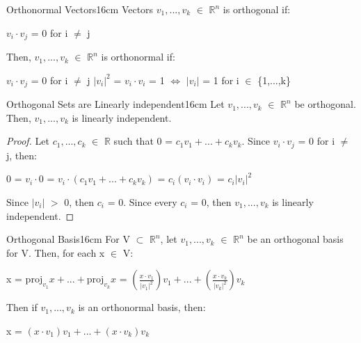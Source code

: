     \begin{definition}{Orthonormal Vectors}{16cm}
        Vectors $v_1,...,v_k$ $\in$ $\mathbb{R}^n$
        is {\color{lblue} orthogonal} if:
        
        \hspace{0.5cm}
        $v_i \cdot v_j$ = 0 for i $\not =$ j

        Then, $v_1,...,v_k$ $\in$ $\mathbb{R}^n$
        is {\color{lblue} orthonormal} if:
        
        \hspace{0.5cm}
        $v_i \cdot v_j$ = 0 for i $\not =$ j
        \hspace{1cm}
        $|v_i|^2$ = $v_i \cdot v_i$ = 1
        \hspace{0.5cm}
        $\Leftrightarrow$
        \hspace{0.5cm}
        $|v_i|$ = 1
        for i $\in$ \{1,...,k\}
    \end{definition}

    \newpage



    \begin{wtheorem}{Orthogonal Sets are Linearly independent}{16cm}
        Let $v_1,...,v_k$ $\in$ $\mathbb{R}^n$ be orthogonal.
        Then, $v_1,...,v_k$ is linearly independent.
    \end{wtheorem}

    \begin{proof}
        Let $c_1,...,c_k$ $\in$ $\mathbb{R}$ such that
        0 = $c_1v_1 + ... + c_kv_k$.
        Since $v_i \cdot v_j$ = 0 for i $\not =$ j, then:

        \hspace{0.5cm}
        0 = $v_i \cdot 0$
        = $v_i \cdot (c_1v_1 + ... + c_kv_k)$
        = $c_i(v_i \cdot v_i)$
        = $c_i|v_i|^2$

        Since $|v_i|$ $>$ 0, then $c_i$ = 0.
        Since every $c_i$ = 0, then $v_1,...,v_k$ is linearly independent.
    \end{proof}

    \vspace{0.5cm}



    \begin{wtheorem}{Orthogonal Basis}{16cm}
        For V $\subset$ $\mathbb{R}^n$, let $v_1,...,v_k$ $\in$ $\mathbb{R}^n$
        be an orthogonal basis for V. Then, for each x $\in$ V:

        \hspace{0.5cm}
        x = $\text{proj}_{v_1}x + ... + \text{proj}_{v_k}x$
        = $(\frac{x \cdot v_1}{|v_1|^2})v_1
            + ... + (\frac{x \cdot v_k}{|v_k|^2})v_k$

        Then if $v_1,...,v_k$ is an orthonormal basis, then:

        \hspace{0.5cm}
        x = $(x \cdot v_1)v_1 + ... + (x \cdot v_k)v_k$
    \end{wtheorem}

